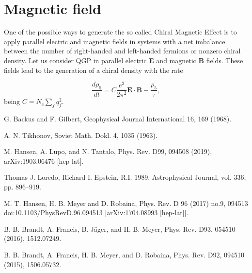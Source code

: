 \documentclass[a4paper,10pt]{article}
\begin{document}
\section{Magnetic field}
One of the possible ways to generate the so called Chiral Magnetic Effect is to apply parallel electric and magnetic fields in systems with a net imbalance between the number of right-handed and left-handed fermions or nonzero chiral density. Let us consider QGP in parallel electric \textbf{E} and magnetic \textbf{B} fields. These fields lead to the generation of a chiral density with the rate

\begin{equation}
\frac{d \rho_5}{dt} = C \frac{e^2}{2 \pi^2}\textbf{E}\cdot \textbf{B} - \frac{\rho_5}{\tau}, 
\end{equation}
being $C = N_c \sum_f q_f^2$.


\newpage
\begin{thebibliography}{9}
G. Backus and F. Gilbert, Geophysical Journal International 16, 169 (1968).

A. N. Tikhonov, Soviet Math. Dokl. 4, 1035 (1963).

M. Hansen, A. Lupo, and N. Tantalo, Phys. Rev. D99,
094508 (2019), arXiv:1903.06476 [hep-lat].

Thomas J. Loredo, Richard I. Epstein,
 R.I. 1989, Astrophysical Journal, vol. 336, pp. 896–919.

M. T. Hansen, H. B. Meyer and D. Robaina, Phys. Rev. D 96 (2017) no.9, 094513 doi:10.1103/PhysRevD.96.094513 [arXiv:1704.08993 [hep-lat]].

B. B. Brandt, A. Francis, B. J\"ager, and H. B. Meyer, Phys. Rev. D93, 054510 (2016), 1512.07249.


B. B. Brandt, A. Francis, H. B. Meyer, and D. Robaina, Phys. Rev. D92, 094510 (2015), 1506.05732.

\end{thebibliography}
\end{document}
